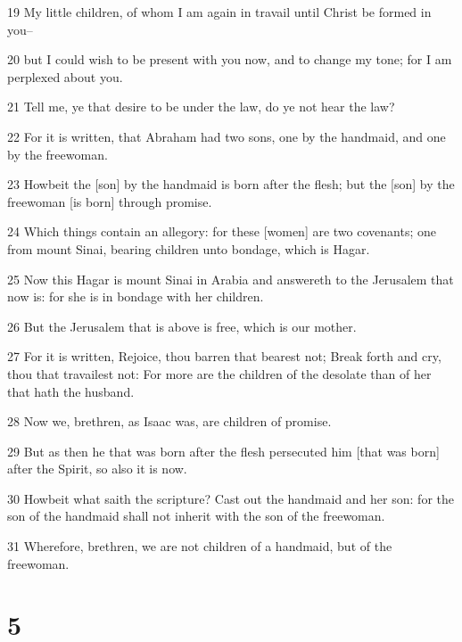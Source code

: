 \par 19 My little children, of whom I am again in travail until Christ be formed in you--
\par 20 but I could wish to be present with you now, and to change my tone; for I am perplexed about you.
\par 21 Tell me, ye that desire to be under the law, do ye not hear the law?
\par 22 For it is written, that Abraham had two sons, one by the handmaid, and one by the freewoman.
\par 23 Howbeit the [son] by the handmaid is born after the flesh; but the [son] by the freewoman [is born] through promise.
\par 24 Which things contain an allegory: for these [women] are two covenants; one from mount Sinai, bearing children unto bondage, which is Hagar.
\par 25 Now this Hagar is mount Sinai in Arabia and answereth to the Jerusalem that now is: for she is in bondage with her children.
\par 26 But the Jerusalem that is above is free, which is our mother.
\par 27 For it is written, Rejoice, thou barren that bearest not; Break forth and cry, thou that travailest not: For more are the children of the desolate than of her that hath the husband.
\par 28 Now we, brethren, as Isaac was, are children of promise.
\par 29 But as then he that was born after the flesh persecuted him [that was born] after the Spirit, so also it is now.
\par 30 Howbeit what saith the scripture? Cast out the handmaid and her son: for the son of the handmaid shall not inherit with the son of the freewoman.
\par 31 Wherefore, brethren, we are not children of a handmaid, but of the freewoman.

\chapter{5}

